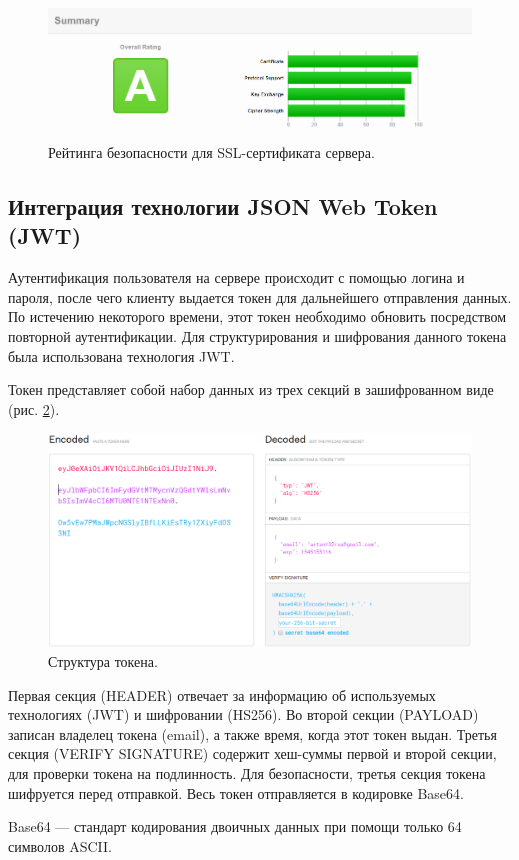 \begin{figure}[h]
    \centering
    \includegraphics[width=1\linewidth]{img/https_score.png}
    \caption{Рейтинга безопасности для SSL-сертификата сервера.}
    \label{fig:https_score}
\end{figure}


\clearpage
\subsection{Интеграция технологии JSON Web Token (JWT)}
Аутентификация пользователя на сервере происходит с помощью логина и пароля, после чего клиенту выдается токен для дальнейшего отправления данных.
По истечению некоторого времени, этот токен необходимо обновить посредством повторной аутентификации.
Для структурирования и шифрования данного токена была использована технология JWT.

Токен представляет собой набор данных из трех секций в зашифрованном виде (рис. \ref{fig:token1}).
\begin{figure}[h]
    \centering
    \includegraphics[width=1\linewidth]{img/token1.png}
    \caption{Структура токена.}
    \label{fig:token1}
\end{figure}
Первая секция (HEADER) отвечает за информацию об используемых технологиях (JWT) и шифровании (HS256).
Во второй секции (PAYLOAD) записан владелец токена (email), а также время, когда этот токен выдан.
Третья секция (VERIFY SIGNATURE) содержит хеш-суммы первой и второй секции, для проверки токена на подлинность.
Для безопасности, третья секция токена шифруется перед отправкой. Весь токен отправляется в кодировке Base64.
\begin{definition}
   Base64 --- стандарт кодирования двоичных данных при помощи только 64 символов ASCII.
\end{definition}


